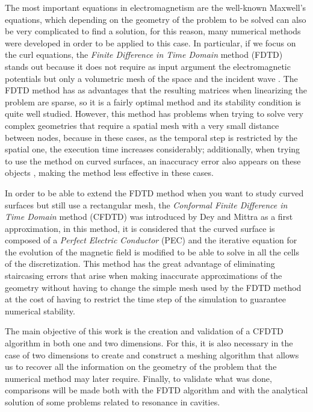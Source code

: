 \documentclass[12pt, oneside]{book}
\begin{document}
The most important equations in electromagnetism are the well-known Maxwell's equations, which depending on the geometry of the problem to be solved can also be very complicated to find a solution, for this reason, many numerical methods were developed in order to be applied to this case. In particular, if we focus on the curl equations, the \textit{Finite Difference in Time Domain} method (FDTD) stands out because it does not require as input argument the electromagnetic potentials but only a volumetric mesh of the space and the incident wave \cite{Taflove2005}. The FDTD method has as advantages that the resulting matrices when linearizing the problem are sparse, so it is a fairly optimal method and its stability condition is quite well studied. However, this method has problems when trying to solve very complex geometries that require a spatial mesh with a very small distance between nodes, because in these cases, as the temporal step is restricted by the spatial one, the execution time increases considerably; additionally, when trying to use the method on curved surfaces, an inaccuracy error also appears on these objects \cite{Dey1997ALC}, making the method less effective in these cases.

In order to be able to extend the FDTD method when you want to study curved surfaces but still use a rectangular mesh, the \textit{Conformal Finite Difference in Time Domain} method (CFDTD) was introduced by Dey and Mittra \cite{DeyMittra1997} as a first approximation, in this method, it is considered that the curved surface is composed of a \textit{Perfect Electric Conductor} (PEC) and the iterative equation for the evolution of the magnetic field is modified to be able to solve in all the cells of the discretization. This method has the great advantage of eliminating staircasing errors that arise when making inaccurate approximations of the geometry \cite{Dey1997ALC} without having to change the simple mesh used by the FDTD method at the cost of having to restrict the time step of the simulation to guarantee numerical stability.

The main objective of this work is the creation and validation of a CFDTD algorithm in both one and two dimensions. For this, it is also necessary in the case of two dimensions to create and construct a meshing algorithm that allows us to recover all the information on the geometry of the problem that the numerical method may later require. Finally, to validate what was done, comparisons will be made both with the FDTD algorithm and with the analytical solution of some problems related to resonance in cavities.
\end{document}
